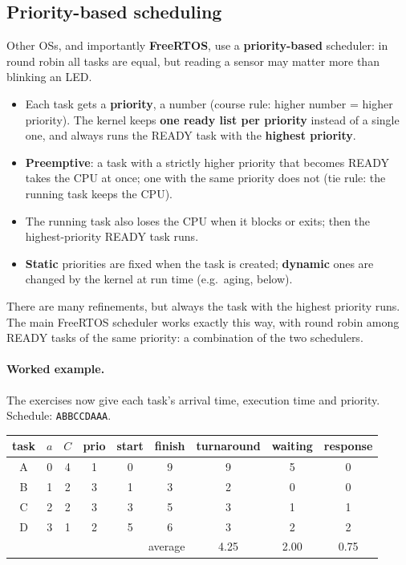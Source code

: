 \subsection{Priority-based scheduling}
Other OSs, and importantly \textbf{FreeRTOS}, use a \textbf{priority-based} scheduler: in round robin all tasks are equal, but reading a sensor may matter more than blinking an LED.
\begin{itemize}
    \item Each task gets a \textbf{priority}, a number (course rule: higher number = higher priority). The kernel keeps \textbf{one ready list per priority} instead of a single one, and always runs the READY task with the \textbf{highest priority}.
    \item \textbf{Preemptive}: a task with a strictly higher priority that becomes READY takes the CPU at once; one with the same priority does not (tie rule: the running task keeps the CPU).
    \item The running task also loses the CPU when it blocks or exits; then the highest-priority READY task runs.
    \item \textbf{Static} priorities are fixed when the task is created; \textbf{dynamic} ones are changed by the kernel at run time (e.g.\ aging, below).
\end{itemize}
There are many refinements, but always the task with the highest priority runs. The main FreeRTOS scheduler works exactly this way, with round robin among READY tasks of the same priority: a combination of the two schedulers.

\paragraph{Worked example.} The exercises now give each task's arrival time, execution time and priority. Schedule: \texttt{ABBCCDAAA}.

\begin{center}
    \begin{tabular}{c c c c | c c c c c}
        \hline
        task & $a$ & $C$ & prio & start & finish & turnaround & waiting & response \\
        \hline
        A & 0 & 4 & 1 & 0 & 9 & 9 & 5 & 0 \\
        B & 1 & 2 & 3 & 1 & 3 & 2 & 0 & 0 \\
        C & 2 & 2 & 3 & 3 & 5 & 3 & 1 & 1 \\
        D & 3 & 1 & 2 & 5 & 6 & 3 & 2 & 2 \\
        \hline
        \multicolumn{6}{r}{average} & 4.25 & 2.00 & 0.75 \\
    \end{tabular}
\end{center}

